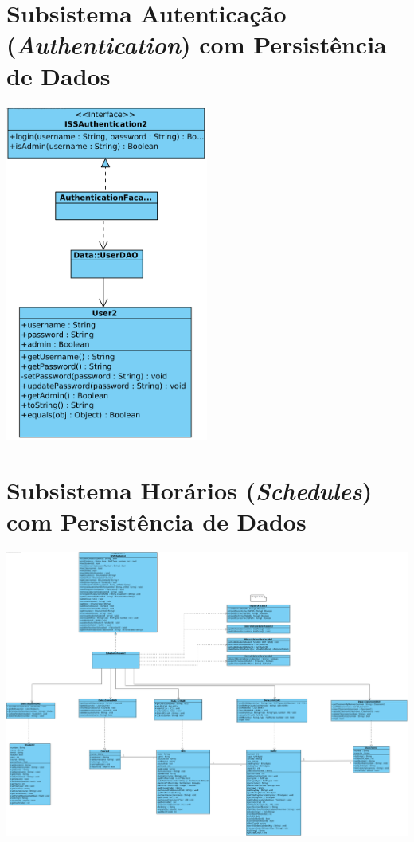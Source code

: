 \documentclass[a4paper,12pt]{scrreprt}
\begin{document}
\section{Subsistema Autenticação (\textit{Authentication}) com Persistência de Dados}

\begin{minipage}{\textwidth}
    \centering
    \includegraphics[width=0.5\textwidth]{images/daos/2-authentication.png}
    \label{fig:6-2-subsistema_autenticacao_com_persistencia_de_dados}
\end{minipage}

\section{Subsistema Horários (\textit{Schedules}) com Persistência de Dados}

\begin{minipage}{\textwidth}
    \centering
    \includegraphics[width=1.5\textwidth, angle=270]{images/daos/3 - schedule.png}
    \label{fig:6-3-subsistema_horarios_com_persistencia_de_dados}
\end{minipage}
\end{document}
